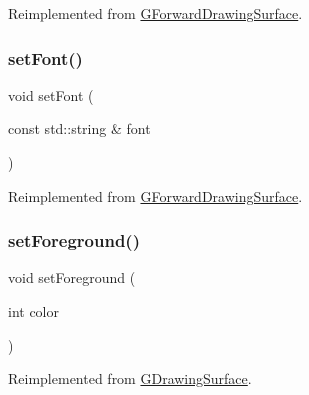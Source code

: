 Reimplemented from \mbox{\hyperlink{classGForwardDrawingSurface_a2d22014c7fa3bccfd58c982aea1b55fa}{G\+Forward\+Drawing\+Surface}}.

\mbox{\label{classGConsoleWindow_ab39ef411fb13a52852ddd138c5932e2e}} 
\subsubsection{\texorpdfstring{set\+Font()}{setFont()}\hspace{0.1cm}{\footnotesize\ttfamily [2/2]}}
{\footnotesize\ttfamily void set\+Font (\begin{DoxyParamCaption}\item[{const std\+::string \&}]{font }\end{DoxyParamCaption})\hspace{0.3cm}{\ttfamily [virtual]}}



Reimplemented from \mbox{\hyperlink{classGForwardDrawingSurface_ab39ef411fb13a52852ddd138c5932e2e}{G\+Forward\+Drawing\+Surface}}.

\mbox{\label{classGConsoleWindow_aec0cb4bd54617629ad4790101f4a3486}} 
\subsubsection{\texorpdfstring{set\+Foreground()}{setForeground()}\hspace{0.1cm}{\footnotesize\ttfamily [1/2]}}
{\footnotesize\ttfamily void set\+Foreground (\begin{DoxyParamCaption}\item[{int}]{color }\end{DoxyParamCaption})\hspace{0.3cm}{\ttfamily [virtual]}}



Reimplemented from \mbox{\hyperlink{classGDrawingSurface_a7daa57084b5811b598fce8726660b328}{G\+Drawing\+Surface}}.

\mbox{\label{classGConsoleWindow_a088e04dfc56273df4cedab2b11b970f5}} 
